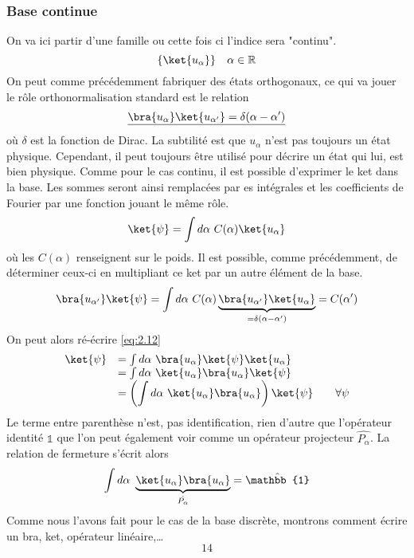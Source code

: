 \subsubsection{Base continue}
On va ici partir d'une famille ou cette fois ci l'indice sera "continu". 
\begin{equation}
\{\ket{u_\alpha}\}\quad \alpha\in\mathbb{R}
\end{equation}
On peut comme précédemment fabriquer des états orthogonaux, ce qui va jouer 
le rôle orthonormalisation standard est le relation
\begin{equation}
\underline{\bra{u_\alpha}\ket{u_{\alpha'}} = \delta(\alpha-\alpha')}
\end{equation}
où $\delta$ est la fonction de Dirac. La subtilité est que $u_\alpha$ n'est 
pas toujours un état physique. Cependant, il peut toujours être utilisé pour 
décrire un état qui lui, est bien physique. Comme pour le cas continu, il 
est possible d'exprimer le ket dans la base. Les sommes seront ainsi 
remplacées par es intégrales et les coefficients de Fourier par une fonction 
jouant le même rôle.
\begin{equation}
\ket{\psi} = \int d\alpha\ C(\alpha)\ket{u_\alpha}
\label{eq:2.12}
\end{equation}
où les $C(\alpha)$ renseignent sur le poids. Il est possible, comme précédemment, 
de déterminer ceux-ci en multipliant ce ket par un autre élément de la base.
\begin{equation}
\bra{u_{\alpha'}}\ket{\psi} = \int d\alpha\ C(\alpha) \underbrace{
\bra{u_{\alpha'}}\ket{u_\alpha}}_{=\delta(\alpha-\alpha')} = C(\alpha')
\end{equation}
On peut alors ré-écrire \autoref{eq:2.12}
\begin{equation}
\begin{array}{ll}
\ket{\psi} &= \int d\alpha\ \bra{u_\alpha}\ket{\psi}\ket{u_\alpha}\\
&= \int d\alpha\ \ket{u_\alpha}\bra{u_\alpha}\ket{\psi}\\
&=\displaystyle\left(\int d\alpha\ \ket{u_\alpha}\bra{u_\alpha}\right)\ket{\psi}
\qquad \forall\psi
\end{array}
\end{equation}
Le terme entre parenthèse n'est, pas identification, rien d'autre que l'opérateur 
identité $\mathbb{1}$ que l'on peut également voir comme un opérateur projecteur
$\hat{P_\alpha}$. La relation de fermeture s'écrit alors
\begin{equation}
\int d\alpha\ \underbrace{\ket{u_\alpha}\bra{u_\alpha}}_{\hat{P_\alpha}} = \hat{
\mathbb{1}}
\end{equation}
Comme nous l'avons fait pour le cas de la base discrète, montrons comment écrire 
un bra, ket, opérateur linéaire,\dots
\begin{equation}
14
\end{equation}

